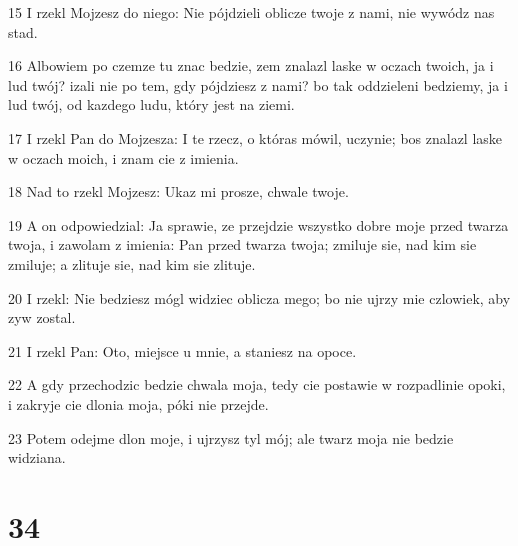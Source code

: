 \par 15 I rzekl Mojzesz do niego: Nie pójdzieli oblicze twoje z nami, nie wywódz nas stad.
\par 16 Albowiem po czemze tu znac bedzie, zem znalazl laske w oczach twoich, ja i lud twój? izali nie po tem, gdy pójdziesz z nami? bo tak oddzieleni bedziemy, ja i lud twój, od kazdego ludu, który jest na ziemi.
\par 17 I rzekl Pan do Mojzesza: I te rzecz, o któras mówil, uczynie; bos znalazl laske w oczach moich, i znam cie z imienia.
\par 18 Nad to rzekl Mojzesz: Ukaz mi prosze, chwale twoje.
\par 19 A on odpowiedzial: Ja sprawie, ze przejdzie wszystko dobre moje przed twarza twoja, i zawolam z imienia: Pan przed twarza twoja; zmiluje sie, nad kim sie zmiluje; a zlituje sie, nad kim sie zlituje.
\par 20 I rzekl: Nie bedziesz mógl widziec oblicza mego; bo nie ujrzy mie czlowiek, aby zyw zostal.
\par 21 I rzekl Pan: Oto, miejsce u mnie, a staniesz na opoce.
\par 22 A gdy przechodzic bedzie chwala moja, tedy cie postawie w rozpadlinie opoki, i zakryje cie dlonia moja, póki nie przejde.
\par 23 Potem odejme dlon moje, i ujrzysz tyl mój; ale twarz moja nie bedzie widziana.

\chapter{34}

